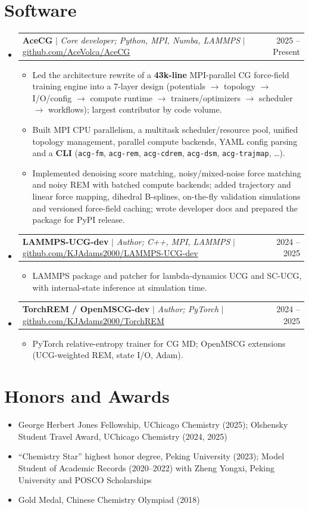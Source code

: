 \documentclass[letterpaper,10.5pt]{article}
\makeatletter
\newcommand{\resumeItem}[1]{\item\small{#1\vspace{-1pt}}}
\newcommand{\resumeProjectHeading}[2]{
    \item
    \begin{tabular*}{\textwidth}{l@{\extracolsep{\fill}}r}
      \small #1 & \small #2 \\
    \end{tabular*}\vspace{-6pt}
}
\newcommand{\resumeSubHeadingListStart}{\begin{itemize}[leftmargin=0.0in, label={}]}
\newcommand{\resumeSubHeadingListEnd}{\end{itemize}}
\newcommand{\resumeItemListStart}{\begin{itemize}[leftmargin=0.18in, itemsep=0.5pt, parsep=0pt]}
\newcommand{\resumeItemListEnd}{\end{itemize}\vspace{-4pt}}
\makeatother
\begin{document}
\section{Software}
  \resumeSubHeadingListStart
    \resumeProjectHeading
      {\textbf{AceCG} $|$ \emph{Core developer; Python, MPI, Numba, LAMMPS} $|$ \href{https://github.com/AceVolca/AceCG}{github.com/AceVolca/AceCG}}{2025 -- Present}
      \resumeItemListStart
        \resumeItem{Led the architecture rewrite of a \textbf{43k-line} MPI-parallel CG force-field training engine into a 7-layer design (potentials $\rightarrow$ topology $\rightarrow$ I/O/config $\rightarrow$ compute runtime $\rightarrow$ trainers/optimizers $\rightarrow$ scheduler $\rightarrow$ workflows); largest contributor by code volume.}
        \resumeItem{Built MPI CPU parallelism, a multitask scheduler/resource pool, unified topology management, parallel compute backends, YAML config parsing and a \textbf{CLI} (\texttt{acg-fm}, \texttt{acg-rem}, \texttt{acg-cdrem}, \texttt{acg-dsm}, \texttt{acg-trajmap}, \dots).}
        \resumeItem{Implemented denoising score matching, noisy/mixed-noise force matching and noisy REM with batched compute backends; added trajectory and linear force mapping, dihedral B-splines, on-the-fly validation simulations and versioned force-field caching; wrote developer docs and prepared the package for PyPI release.}
      \resumeItemListEnd
    \resumeProjectHeading
      {\textbf{LAMMPS-UCG-dev} $|$ \emph{Author; C++, MPI, LAMMPS} $|$ \href{https://github.com/KJAdams2000/LAMMPS-UCG-dev}{github.com/KJAdams2000/LAMMPS-UCG-dev}}{2024 -- 2025}
      \resumeItemListStart
        \resumeItem{LAMMPS package and patcher for lambda-dynamics UCG and SC-UCG, with internal-state inference at simulation time.}
      \resumeItemListEnd
    \resumeProjectHeading
      {\textbf{TorchREM / OpenMSCG-dev} $|$ \emph{Author; PyTorch} $|$ \href{https://github.com/KJAdams2000/TorchREM}{github.com/KJAdams2000/TorchREM}}{2024 -- 2025}
      \resumeItemListStart
        \resumeItem{PyTorch relative-entropy trainer for CG MD; OpenMSCG extensions (UCG-weighted REM, state I/O, Adam).}
      \resumeItemListEnd
  \resumeSubHeadingListEnd

\section{Honors and Awards}
  \begin{itemize}[leftmargin=0.18in, itemsep=0pt]
    \resumeItem{George Herbert Jones Fellowship, UChicago Chemistry (2025); Olshensky Student Travel Award, UChicago Chemistry (2024, 2025)}
    \resumeItem{``Chemistry Star'' highest honor degree, Peking University (2023); Model Student of Academic Records (2020--2022) with Zheng Yongxi, Peking University and POSCO Scholarships}
    \resumeItem{Gold Medal, Chinese Chemistry Olympiad (2018)}
  \end{itemize}
\end{document}

